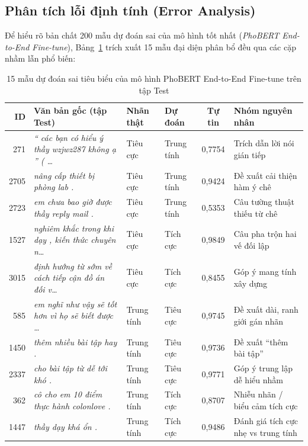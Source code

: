 \documentclass[12pt,a4paper]{article}
\begin{document}
\subsection{Phân tích lỗi định tính (Error Analysis)}
Để hiểu rõ bản chất 200 mẫu dự đoán sai của mô hình tốt nhất (\textit{PhoBERT End-to-End Fine-tune}), Bảng~\ref{tab:text_error_analysis} trích xuất 15 mẫu đại diện phân bổ đều qua các cặp nhầm lẫn phổ biến:

\begin{table}[htbp]
\centering
\caption{15 mẫu dự đoán sai tiêu biểu của mô hình PhoBERT End-to-End Fine-tune trên tập Test}
\label{tab:text_error_analysis}
\scriptsize
\setlength{\tabcolsep}{3.5pt}
\begin{tabularx}{\textwidth}{|r|>{\raggedright\arraybackslash}X|l|l|c|p{3.0cm}|}
\hline
\textbf{ID} & \textbf{Văn bản gốc (tập Test)} & \textbf{Nhãn thật} & \textbf{Dự đoán} & \textbf{Tự tin} & \textbf{Nhóm nguyên nhân} \\
\hline
271  & \textit{`` các bạn có hiểu ý thầy wzjwz287 không ạ '' ( \dots} & Tiêu cực & Trung tính & 0,7754 & Trích dẫn lời nói gián tiếp \\
2705 & \textit{nâng cấp thiết bị phòng lab .} & Tiêu cực & Trung tính & 0,9424 & Đề xuất cải thiện hàm ý chê \\
2723 & \textit{em chưa bao giờ được thầy reply mail .} & Tiêu cực & Trung tính & 0,5353 & Câu tường thuật thiếu từ chê \\
1527 & \textit{nghiêm khắc trong khi dạy , kiến thức chuyên n\dots} & Tiêu cực & Tích cực & 0,9849 & Câu pha trộn hai vế đối lập \\
3015 & \textit{định hướng từ sớm về cách tiếp cận đồ án đối v\dots} & Tiêu cực & Tích cực & 0,8455 & Góp ý mang tính xây dựng \\
\hline
585  & \textit{em nghĩ như vậy sẽ tốt hơn vì họ sẽ biết được \dots} & Trung tính & Tiêu cực & 0,9745 & Đề xuất dài, ranh giới gán nhãn \\
1450 & \textit{thêm nhiều bài tập hay .} & Trung tính & Tiêu cực & 0,9736 & Đề xuất ``thêm bài tập'' \\
2337 & \textit{cho bài tập từ dễ tới khó .} & Trung tính & Tiêu cực & 0,9771 & Góp ý trung lập dễ hiểu nhầm \\
362  & \textit{cô cho em 10 điểm thực hành colonlove .} & Trung tính & Tích cực & 0,8707 & Nhiễu nhãn / biểu cảm tích cực \\
1447 & \textit{thầy dạy khá ổn .} & Trung tính & Tích cực & 0,9486 & Đánh giá tích cực nhẹ vs trung tính \\

\end{tabularx}
\end{table}
\end{document}
